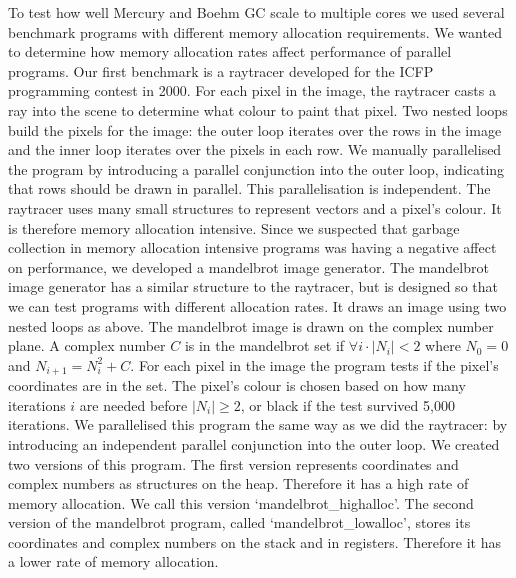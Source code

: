 To test how well Mercury and Boehm GC scale to multiple cores we used several
benchmark programs with different memory allocation requirements.
We wanted to determine how memory allocation rates affect
performance of parallel programs.
Our first benchmark is a raytracer developed for the
ICFP programming contest in 2000.
For each pixel in the image,
the raytracer casts a ray into the scene to determine what colour to paint that pixel.
Two nested loops build the pixels for the image:
the outer loop iterates over the rows in the image and
the inner loop iterates over the pixels in each row.
We manually parallelised the program by introducing a parallel
conjunction into the outer loop,
indicating that rows should be drawn in parallel.
This parallelisation is independent.
The raytracer uses many small structures to represent vectors and a pixel's
colour.
It is therefore memory allocation intensive.
Since we suspected that garbage collection in memory allocation intensive
programs was having a negative affect on performance,
we developed a mandelbrot image generator.
The mandelbrot image generator has a similar structure to the raytracer,
but is designed so that we can test programs with different allocation rates.
It draws an image using two nested loops as above.
The mandelbrot image is drawn on the complex number plane.
A complex number $C$ is in the mandelbrot set if
$\forall i \cdot |N_i| < 2$ where $N_0 = 0$ and $N_{i+1} = N_{i}^2 + C$.
For each pixel in the image the program tests if the pixel's coordinates are
in the set.
The pixel's colour is chosen based on how many iterations $i$ are needed
before $|N_i| \ge 2$,
or black if the test survived 5,000 iterations.
We parallelised this program the same way as we did the raytracer:
by introducing an independent parallel conjunction into the outer loop.
We created two versions of this program.
The first version represents coordinates and complex numbers as structures
on the heap.
Therefore it has a high rate of memory allocation.
We call this version `mandelbrot\_highalloc'.
The second version of the mandelbrot program,
called `mandelbrot\_lowalloc',
stores its coordinates and complex numbers on the stack and in registers.
Therefore it has a lower rate of memory allocation.



